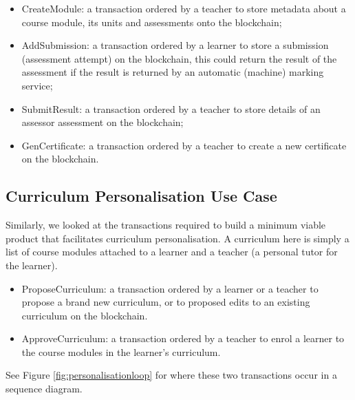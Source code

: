 \begin{itemize}
	\setlength\itemsep{0em}
	\item CreateModule: a transaction ordered by a teacher to store metadata about a course module,
	      its units and assessments onto the blockchain;
	\item AddSubmission: a transaction ordered by a learner to store a submission (assessment attempt)
	      on the blockchain, this could return the result of the assessment if the result is returned by
	      an automatic (machine) marking service;
	\item SubmitResult: a transaction ordered by a teacher to store details of an assessor assessment
	      on the blockchain;
	\item GenCertificate: a transaction ordered by a teacher to create a new certificate on the blockchain.
\end{itemize}

\subsection{Curriculum Personalisation Use Case}

Similarly, we looked at the transactions required to build a minimum viable product
that facilitates curriculum personalisation. A curriculum here is simply a list of course
modules attached to a learner and a teacher (a personal tutor for the learner).

\begin{itemize}
	\setlength\itemsep{0em}
	\item ProposeCurriculum: a transaction ordered by a learner or a teacher to propose
	      a brand new curriculum, or to proposed edits to an existing curriculum on the blockchain.
	\item ApproveCurriculum: a transaction ordered by a teacher to enrol a learner to
	      the course modules in the learner's curriculum.
\end{itemize}

See Figure \ref{fig:personalisationloop} for where these two transactions occur in a sequence diagram.

